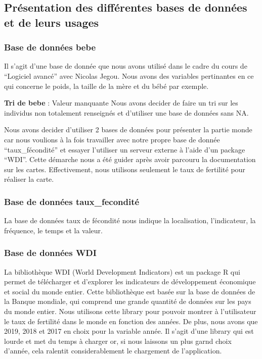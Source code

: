 \documentclass[
]{article}
\begin{document}
\hypertarget{pruxe9sentation-des-diffuxe9rentes-bases-de-donnuxe9es-et-de-leurs-usages}{%
\subsection{Présentation des différentes bases de données et de leurs
usages}\label{pruxe9sentation-des-diffuxe9rentes-bases-de-donnuxe9es-et-de-leurs-usages}}

\hypertarget{base-de-donnuxe9es-bebe}{%
\subsubsection{Base de données bebe}\label{base-de-donnuxe9es-bebe}}

Il s'agit d'une base de donnée que nous avons utilisé dans le cadre du
cours de ``Logiciel avancé'' avec Nicolas Jegou. Nous avons des
variables pertinantes en ce qui concerne le poids, la taille de la mère
et du bébé par exemple.

\textbf{Tri de bebe} : Valeur manquante Nous avons decider de faire un
tri sur les individus non totalement renseignés et d'utiliser une base
de données sans NA.

Nous avons decider d'utiliser 2 bases de données pour présenter la
partie monde car nous voulions à la fois travailler avec notre propre
base de donnée ``taux\_fécondité'' et essayer l'utiliser un serveur
externe à l'aide d'un package ``WDI''. Cette démarche nous a été guider
après avoir parcouru la documentation sur les cartes. Effectivement,
nous utilisons seulement le taux de fertilité pour réaliser la carte.

\hypertarget{base-de-donnuxe9es-taux_fecondituxe9}{%
\subsubsection{Base de données
taux\_fecondité}\label{base-de-donnuxe9es-taux_fecondituxe9}}

La base de données taux de fécondité nous indique la localisation,
l'indicateur, la fréquence, le temps et la valeur.

\hypertarget{base-de-donnuxe9es-wdi}{%
\subsubsection{Base de données WDI}\label{base-de-donnuxe9es-wdi}}

La bibliothèque WDI (World Development Indicators) est un package R qui
permet de télécharger et d'explorer les indicateurs de développement
économique et social du monde entier. Cette bibliothèque est basée sur
la base de données de la Banque mondiale, qui comprend une grande
quantité de données sur les pays du monde entier. Nous utilisons cette
library pour pouvoir montrer à l'utilisateur le taux de fertilité dans
le monde en fonction des années. De plus, nous avons que 2019, 2018 et
2017 en choix pour la variable année. Il s'agit d'une library qui est
lourde et met du temps à charger or, si nous laissons un plus garnd
choix d'année, cela ralentit considerablement le chargement de
l'application.
\end{document}
